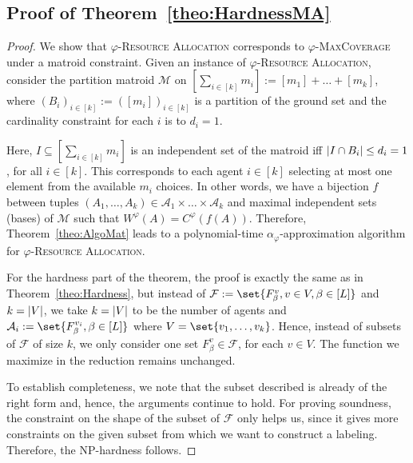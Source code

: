 \subsection{Proof of Theorem~\ref{theo:HardnessMA}}
\label{app:HardnessMA}
\begin{proof}
We show that $\varphi$-\textsc{Resource Allocation} corresponds to $\varphi$-\textsc{MaxCoverage} under a matroid constraint. Given an instance of $\varphi$-\textsc{Resource Allocation}, consider the partition matroid $\mathcal{M}$ on $[\sum_{i \in[k]} m_i] := [m_1] + \ldots + [m_k]$, where $(B_i)_{i \in [k]} := ([m_i])_{i \in [k]}$ is a partition of the ground set and the cardinality constraint  for each $i$ is to $d_i=1$. 

Here, $I \subseteq [\sum_{i \in[k]} m_i]$ is an independent set of the matroid iff $\abs{I \cap B_i} \leq d_i = 1$, for all $i \in [k]$. This corresponds to each agent $i \in [k]$ selecting at most one element from the available $m_i$ choices. In other words, we have a bijection $f$ between tuples $(A_1, \ldots, A_k) \in \mathcal{A}_1 \times \ldots \times \mathcal{A}_k$ and maximal independent sets (bases) of $\mathcal{M}$ such that $W^{\varphi}(A) = C^{\varphi}(f(A))$. Therefore, Theorem~\ref{theo:AlgoMat} leads to a polynomial-time $\alpha_{\varphi}$-approximation algorithm for $\varphi$-\textsc{Resource Allocation}. 

For the hardness part of the theorem, the proof is exactly the same as in Theorem~\ref{theo:Hardness}, but instead of $\mathcal{F} := \set{F^v_{\beta}, v \in V, \beta \in [L]}$ and $k = \abs{V}$, we take  $k = \abs{V}$ to be the number of agents and $\mathcal{A}_i := \set{F^{v_i}_{\beta}, \beta \in [L]}$ where $V =\set{v_1, \ldots, v_k}$. Hence, instead of subsets of $\mathcal{F}$ of size $k$, we only consider one set $F^v_{\beta} \in \mathcal{F}$, for each $v \in V$. The function we maximize in the reduction remains unchanged. 

To establish completeness, we note that the subset described is already of the right form and, hence, the arguments continue to hold. For proving soundness, the constraint on the shape of the subset of $\mathcal{F}$ only helps us, since it gives more constraints on the given subset from which we want to construct a labeling. Therefore, the \textrm{NP}-hardness follows.
\end{proof}
